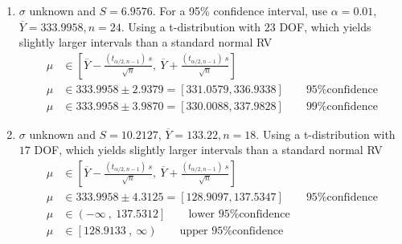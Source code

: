 \begin{enumerate}
\begin{subequations}
\begin{enumerate}
			\item For large $ n $, this can be approximated to a standard normal RV $ Z $.
			\begin{align}
				A = 2z_{\alpha/2}\ \frac{S_m}{\sqrt{n}}
			\end{align}
	Solving for $ n $ gives the size of the full sample.
		\end{enumerate}
	\end{subequations}

	\item $ \sigma $ unknown and $ S = 6.9576 $. For a 95\% confidence interval, use $ \alpha = 0.01 $, $ \overline{Y} = 333.9958, n = 24$. Using a t-distribution with $ 23 $ DOF, which yields slightly larger intervals than a standard normal RV\\
	\begin{subequations}
		\begin{align}
			\mu &\in \left[ \overline{Y} - \frac{(t_{\alpha/2, n-1})\ s}{\sqrt{n}}, \ \overline{Y} + \frac{(t_{\alpha/2, n-1})\ s}{\sqrt{n}} \right] \nonumber \\
			\mu &\in 333.9958 \pm 2.9379 = [331.0579, 336.9338] \qquad \text{95\% confidence} \nonumber \\
			\mu &\in 333.9958 \pm 3.9870 = [330.0088, 337.9828] \qquad \text{99\% confidence} 
		\end{align}
	\end{subequations}

	\item $ \sigma $ unknown and $ S = 10.2127 $, $ \overline{Y} = 133.22, n = 18$. Using a t-distribution with $ 17 $ DOF, which yields slightly larger intervals than a standard normal RV\\
	\begin{subequations}
		\begin{align}
			\mu &\in \left[ \overline{Y} - \frac{(t_{\alpha/2, n-1})\ s}{\sqrt{n}}, \ \overline{Y} + \frac{(t_{\alpha/2, n-1})\ s}{\sqrt{n}} \right] \nonumber \\
			\mu &\in 333.9958 \pm 4.3125 = [128.9097, 137.5347] \qquad \text{95\% confidence} \nonumber \\
			\mu &\in \left(-\infty\ ,\  137.5312\right] \qquad \text{lower 95\% confidence} \nonumber \\
			\mu &\in \left[128.9133\ ,\ \infty\right) \qquad \text{upper 95\% confidence}
		\end{align}
	\end{subequations}


\end{enumerate}
